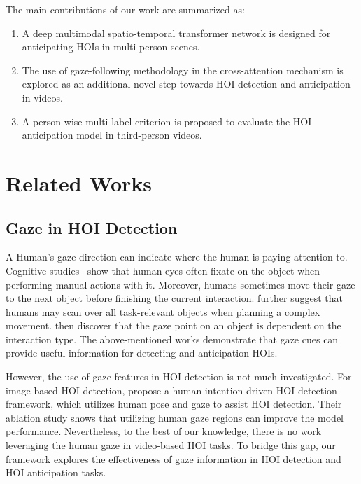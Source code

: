 \documentclass[times,twocolumn,final,authoryear]{elsarticle}
\begin{document}
The main contributions of our work are summarized as:
\begin{enumerate}
    \item A deep multimodal spatio-temporal transformer network is designed for anticipating HOIs in multi-person scenes.
    \item The use of gaze-following methodology in the cross-attention mechanism is explored as an additional novel step towards HOI detection and anticipation in videos.   
    \item A person-wise multi-label criterion is proposed to evaluate the HOI anticipation model in third-person videos.
\end{enumerate}


\section{Related Works}

\subsection{Gaze in HOI Detection}
A Human's gaze direction can indicate where the human is paying attention to. Cognitive studies~\citep{eye:what_ways, eye:visual_memory} show that human eyes often fixate on the object when performing manual actions with it. Moreover, humans sometimes move their gaze to the next object before finishing the current interaction. \citet{eye:landscape} further suggest that humans may scan over all task-relevant objects when planning a complex movement. \citet{eye:planning_precise} then discover that the gaze point on an object is dependent on the interaction type. The above-mentioned works demonstrate that gaze cues can provide useful information for detecting and anticipation HOIs. 

However, the use of gaze features in HOI detection is not much investigated. For image-based HOI detection, \citet{hoi_i2:interact_intend} propose a human intention-driven HOI detection framework, which utilizes human pose and gaze to assist HOI detection. Their ablation study shows that utilizing human gaze regions can improve the model performance. Nevertheless, to the best of our knowledge, there is no work leveraging the human gaze in video-based HOI tasks. To bridge this gap, our framework explores the effectiveness of gaze information in HOI detection and HOI anticipation tasks. 
\end{document}
